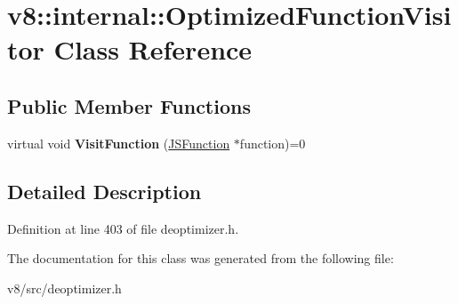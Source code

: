 \hypertarget{classv8_1_1internal_1_1OptimizedFunctionVisitor}{}\section{v8\+:\+:internal\+:\+:Optimized\+Function\+Visitor Class Reference}
\label{classv8_1_1internal_1_1OptimizedFunctionVisitor}
\subsection*{Public Member Functions}
\begin{DoxyCompactItemize}
\item 
\mbox{\label{classv8_1_1internal_1_1OptimizedFunctionVisitor_a923258325037bafd70685dc995fb7832}} 
virtual void {\bfseries Visit\+Function} (\mbox{\hyperlink{classv8_1_1internal_1_1JSFunction}{J\+S\+Function}} $\ast$function)=0
\end{DoxyCompactItemize}


\subsection{Detailed Description}


Definition at line 403 of file deoptimizer.\+h.



The documentation for this class was generated from the following file\+:\begin{DoxyCompactItemize}
\item 
v8/src/deoptimizer.\+h\end{DoxyCompactItemize}
